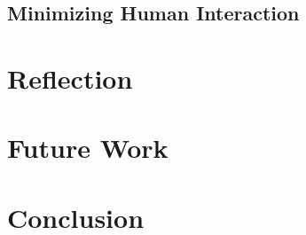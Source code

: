 \documentclass[12pt]{article}
\begin{document}
    \subsection{Minimizing Human Interaction}\label{subsec:minimizing-human-interaction}


    \pagebreak


    \section{Reflection}\label{sec:reflection}


    \pagebreak


    \section{Future Work}\label{sec:future-work}


    \pagebreak


    \section{Conclusion}\label{sec:conclusion}


    \pagebreak


    \printbibliography[heading=bibintoc,title={References}]

    \pagebreak
\end{document}

